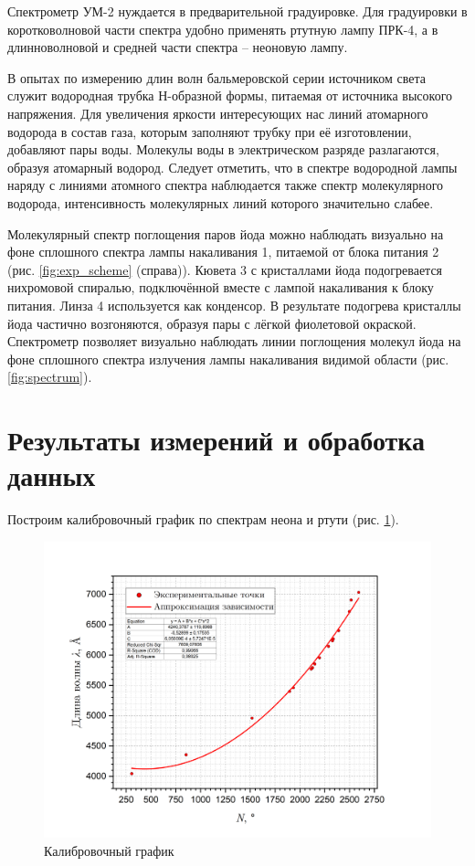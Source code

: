 \documentclass[a4paper, 12pt]{article}
\begin{document}
    Спектрометр УМ-2 нуждается в предварительной градуировке. Для градуировки в коротковолновой части спектра удобно применять ртутную лампу ПРК-4, а в длинноволновой и средней части спектра -- неоновую лампу.

    В опытах по измерению длин волн бальмеровской серии источником света служит водородная трубка Н-образной формы, питаемая от источника высокого напряжения. Для увеличения яркости интересующих нас линий атомарного водорода в состав газа, которым заполняют трубку при её изготовлении, добавляют пары воды. Молекулы воды в электрическом разряде разлагаются, образуя атомарный водород. Следует отметить, что в спектре водородной лампы наряду с линиями атомного спектра наблюдается также спектр молекулярного водорода, интенсивность молекулярных линий которого значительно слабее.

    Молекулярный спектр поглощения паров йода можно наблюдать визуально на фоне сплошного спектра лампы накаливания 1, питаемой от блока питания 2 (рис. \ref{fig:exp_scheme} (справа)). Кювета 3 с кристаллами йода подогревается нихромовой спиралью, подключённой вместе с лампой накаливания к блоку питания. Линза 4 используется как конденсор. В результате подогрева кристаллы йода частично возгоняются, образуя пары с лёгкой фиолетовой окраской. Спектрометр позволяет визуально наблюдать линии поглощения молекул йода на фоне сплошного спектра излучения лампы накаливания видимой области (рис. \ref{fig:spectrum}).

    \newpage
	
    \section{Результаты измерений и обработка данных}
	
    Построим калибровочный график по спектрам неона и ртути (рис. \ref{fig:calibration_graph}).
    
    \begin{figure}[H]
        \centering
        \includegraphics[width = 0.8\linewidth]{images/calibration_graph.png}
        \caption{Калибровочный график}
        \label{fig:calibration_graph}
    \end{figure}
    	
\end{document}
